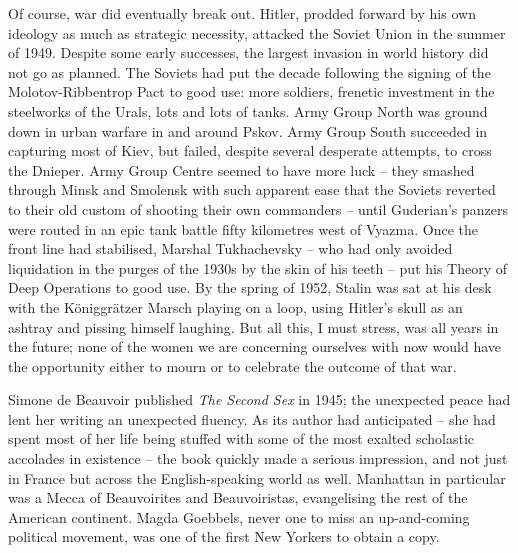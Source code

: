 \divsep

Of course, war did eventually break out. Hitler, prodded forward by his own ideology as much as strategic necessity, attacked the Soviet Union in the summer of 1949. Despite some early successes, the largest invasion in world history did not go as planned. The Soviets had put the decade following the signing of the Molotov-Ribbentrop Pact to good use: more soldiers, frenetic investment in the steelworks of the Urals, lots and lots of tanks. Army Group North was ground down in urban warfare in and around Pskov. Army Group South succeeded in capturing most of Kiev, but failed, despite several desperate attempts, to cross the Dnieper. Army Group Centre seemed to have more luck -- they smashed through Minsk and Smolensk with such apparent ease that the Soviets reverted to their old custom of shooting their own commanders -- until Guderian's panzers were routed in an epic tank battle fifty kilometres west of Vyazma. Once the front line had stabilised, Marshal Tukhachevsky -- who had only avoided liquidation in the purges of the 1930s by the skin of his teeth -- put his Theory of Deep Operations to good use. By the spring of 1952, Stalin was sat at his desk with the Königgrätzer Marsch playing on a loop, using Hitler's skull as an ashtray and pissing himself laughing. But all this, I must stress, was all years in the future; none of the women we are concerning ourselves with now would have the opportunity either to mourn or to celebrate the outcome of that war.

Simone de Beauvoir published \textit{The Second Sex} in 1945; the unexpected peace had lent her writing an unexpected fluency. As its author had anticipated -- she had spent most of her life being stuffed with some of the most exalted scholastic accolades in existence -- the book quickly made a serious impression, and not just in France but across the English-speaking world as well. Manhattan in particular was a Mecca of Beauvoirites and Beauvoiristas, evangelising the rest of the American continent. Magda Goebbels, never one to miss an up-and-coming political movement, was one of the first New Yorkers to obtain a copy.

